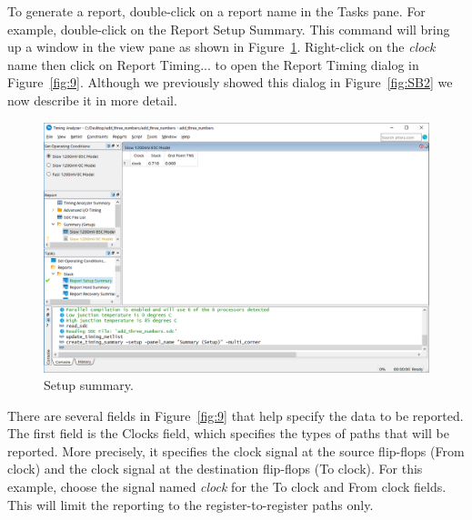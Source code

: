 \documentclass[11pt, twoside, pdftex]{article}
\begin{document}
To generate a report, double-click on a report name in the Tasks pane. 
For example, double-click on the {\sf Report Setup Summary}. This command
will bring up a window in the view pane as shown in Figure~\ref{fig:7}. Right-click on the
{\it clock} name then click on {\sf Report Timing...} to open the Report Timing dialog in Figure~\ref{fig:9}. Although we previously 
showed this dialog in Figure~\ref{fig:SB2} we now describe it in more detail. 

\begin{figure}[H]
\begin{center}
\includegraphics[scale=0.5]{figures/figure7.png}
\end{center}
\caption{Setup summary.}
\label{fig:7}
\end{figure}

There are several fields in Figure~\ref{fig:9} that help specify the data to be reported. The 
first field is the {\sf Clocks} field, which specifies the types of paths that will be reported. 
More precisely, it specifies the clock signal at the source flip-flops ({\sf From clock}) 
and the clock signal at the destination flip-flops ({\sf To clock}).  For this example, choose 
the signal named {\it clock} for the 
{\sf To clock} and {\sf From clock} fields. This will limit the reporting to the 
register-to-register paths only.
\end{document}
